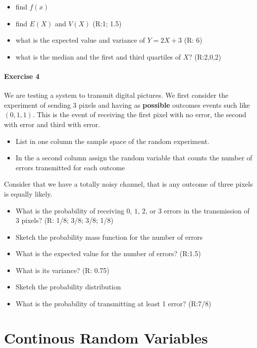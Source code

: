 \documentclass[
]{book}
\providecommand{\tightlist}{%
  \setlength{\itemsep}{0pt}\setlength{\parskip}{0pt}}
\begin{document}
\begin{itemize}
\tightlist
\item
  find \(f(x)\)
\item
  find \(E(X)\) and \(V(X)\) (R:1; 1.5)
\item
  what is the expected value and variance of \(Y=2X+3\) (R: 6)
\item
  what is the median and the first and third quartiles of \(X\)? (R:2,0,2)
\end{itemize}

\hypertarget{exercise-4-1}{%
\subsubsection{Exercise 4}\label{exercise-4-1}}

We are testing a system to transmit digital pictures. We first consider the experiment of sending \(3\) pixels and having as \textbf{possible} outcomes events such like \((0,1,1)\). This is the event of receiving the first pixel with no error, the second with error and third with error.

\begin{itemize}
\item
  List in one column the sample space of the random experiment.
\item
  In the a second column assign the random variable that counts the number of errors transmitted for each outcome
\end{itemize}

Consider that we have a totally noisy channel, that is any outcome of three pixels is equally likely.

\begin{itemize}
\item
  What is the probability of receiving \(0\), \(1\), \(2\), or \(3\) errors in the transmission of \(3\) pixels? (R: 1/8; 3/8; 3/8; 1/8)
\item
  Sketch the probability mass function for the number of errors
\item
  What is the expected value for the number of errors? (R:1.5)
\item
  What is its variance? (R: 0.75)
\item
  Sketch the probability distribution
\item
  What is the probability of transmitting at least 1 error? (R:7/8)
\end{itemize}

\hypertarget{continous-random-variables}{%
\chapter{Continous Random Variables}\label{continous-random-variables}}
\end{document}

